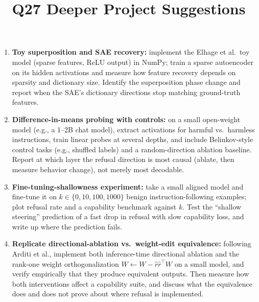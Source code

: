 \documentclass[11pt]{article}
\title{Q27 Deeper Project Suggestions}
\date{}
\begin{document}
\maketitle
\begin{enumerate}[noitemsep]
\item \textbf{Toy superposition and SAE recovery:} implement the Elhage et al.\ toy model (sparse features, ReLU output) in NumPy; train a sparse autoencoder on its hidden activations and measure how feature recovery depends on sparsity and dictionary size. Identify the superposition phase change and report when the SAE's dictionary directions stop matching ground-truth features.
\item \textbf{Difference-in-means probing with controls:} on a small open-weight model (e.g., a 1--2B chat model), extract activations for harmful vs.\ harmless instructions, train linear probes at several depths, and include Belinkov-style control tasks (e.g., shuffled labels) and a random-direction ablation baseline. Report at which layer the refusal direction is most causal (ablate, then measure behavior change), not merely most decodable.
\item \textbf{Fine-tuning-shallowness experiment:} take a small aligned model and fine-tune it on $k \in \{0, 10, 100, 1000\}$ benign instruction-following examples; plot refusal rate and a capability benchmark against $k$. Test the ``shallow steering'' prediction of a fast drop in refusal with slow capability loss, and write up where the prediction fails.
\item \textbf{Replicate directional-ablation vs.\ weight-edit equivalence:} following Arditi et al., implement both inference-time directional ablation and the rank-one weight orthogonalization $W \leftarrow W - \hat{r}\hat{r}^{\top} W$ on a small model, and verify empirically that they produce equivalent outputs. Then measure how both interventions affect a capability suite, and discuss what the equivalence does and does not prove about where refusal is implemented.
\end{enumerate}
\end{document}
